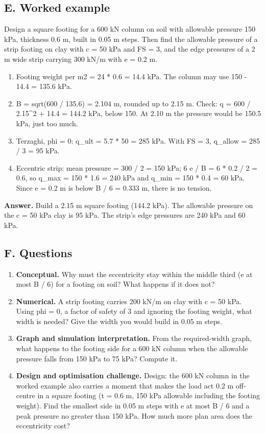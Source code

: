 \documentclass[11pt,a4paper]{article}
\begin{document}
\subsection*{E. Worked example}
Design a square footing for a 600 kN column on soil with allowable pressure 150 kPa, thickness 0.6 m, built in 0.05 m steps. Then find the allowable pressure of a strip footing on clay with c = 50 kPa and FS = 3, and the edge pressures of a 2 m wide strip carrying 300 kN/m with e = 0.2 m.
\begin{enumerate}[nosep]
\item Footing weight per m2 = 24 * 0.6 = 14.4 kPa. The column may use 150 - 14.4 = 135.6 kPa.
\item B = sqrt(600 / 135.6) = 2.104 m, rounded up to 2.15 m. Check: q = 600 / 2.15\textasciicircum{}2 + 14.4 = 144.2 kPa, below 150. At 2.10 m the pressure would be 150.5 kPa, just too much.
\item Terzaghi, phi = 0: q\_ult = 5.7 * 50 = 285 kPa. With FS = 3, q\_allow = 285 / 3 = 95 kPa.
\item Eccentric strip: mean pressure = 300 / 2 = 150 kPa; 6 e / B = 6 * 0.2 / 2 = 0.6, so q\_max = 150 * 1.6 = 240 kPa and q\_min = 150 * 0.4 = 60 kPa. Since e = 0.2 m is below B / 6 = 0.333 m, there is no tension.
\end{enumerate}
\textbf{Answer.} Build a 2.15 m square footing (144.2 kPa). The allowable pressure on the c = 50 kPa clay is 95 kPa. The strip's edge pressures are 240 kPa and 60 kPa.

\subsection*{F. Questions}
\begin{enumerate}[nosep]
\item \textbf{Conceptual.} Why must the eccentricity stay within the middle third (e at most B / 6) for a footing on soil? What happens if it does not?
\item \textbf{Numerical.} A strip footing carries 200 kN/m on clay with c = 50 kPa. Using phi = 0, a factor of safety of 3 and ignoring the footing weight, what width is needed? Give the width you would build in 0.05 m steps.
\item \textbf{Graph and simulation interpretation.} From the required-width graph, what happens to the footing side for a 600 kN column when the allowable pressure falls from 150 kPa to 75 kPa? Compute it.
\item \textbf{Design and optimisation challenge.} Design: the 600 kN column in the worked example also carries a moment that makes the load act 0.2 m off-centre in a square footing (t = 0.6 m, 150 kPa allowable including the footing weight). Find the smallest side in 0.05 m steps with e at most B / 6 and a peak pressure no greater than 150 kPa. How much more plan area does the eccentricity cost?
\end{enumerate}
\end{document}
